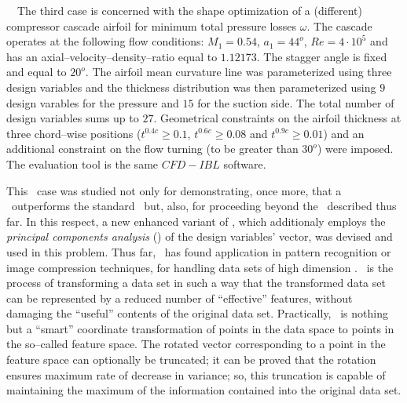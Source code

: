 \documentclass{vki_ls}
\newcommand{\xeraki}{\Pisymbol{ding}{13}~~}
\begin{document}
\xeraki The third case is concerned with the shape optimization of a (different) compressor cascade airfoil for minimum total pressure losses $\omega$. 
The cascade operates at the following flow conditions: $M_1\!=\!0.54$, 
$a_1\!=\!44^o$, $Re\!=\!4\cdot10^5$ and has an axial--velocity--density--ratio equal to $1.12173$. The stagger angle is fixed and equal to $20^o$.
The airfoil mean curvature line was parameterized using three design variables and the thickness distribution was then parameterized using $9$ design varables for the pressure and $15$ for the suction side. 
The total number of design variables sums up to $27$.
Geometrical constraints on the airfoil thickness at three chord--wise positions ($t^{0.4c}\geq0.1$, $t^{0.6c}\geq0.08$ and $t^{0.9c}\geq0.01$) and an additional constraint on the flow turning (to be greater than $30^o$) were
imposed. The evaluation tool is the same $CFD-IBL$ software.

This \SOO\ case was studied not only for demonstrating, once more, that a \MAEA\ outperforms the standard \EA\ but, also, for proceeding beyond the \MAEAs\ described thus far. In this respect, a new enhanced variant of \MAEAs, which additionaly employs the \textit{principal components analysis} (\PCA) of the design variables' vector, was devised and used in this problem. Thus far, \PCA\ has found application in pattern recognition or image compression techniques, for handling data sets of high dimension \cite{Hayk1999}. \PCA\ is the process of transforming a data set in such a way that the transformed data set can be represented by a reduced number of ``effective'' features, without damaging the ``useful'' contents of the original data set. Practically, \PCA\ is nothing but a ``smart'' coordinate transformation of points in the data space to points in the so--called feature space. The rotated vector corresponding to a point in the feature space can optionally be truncated; it can be proved that the rotation ensures maximum rate of decrease in variance; so, this truncation is capable of maintaining the maximum of the information contained into the original data set.
\end{document}
